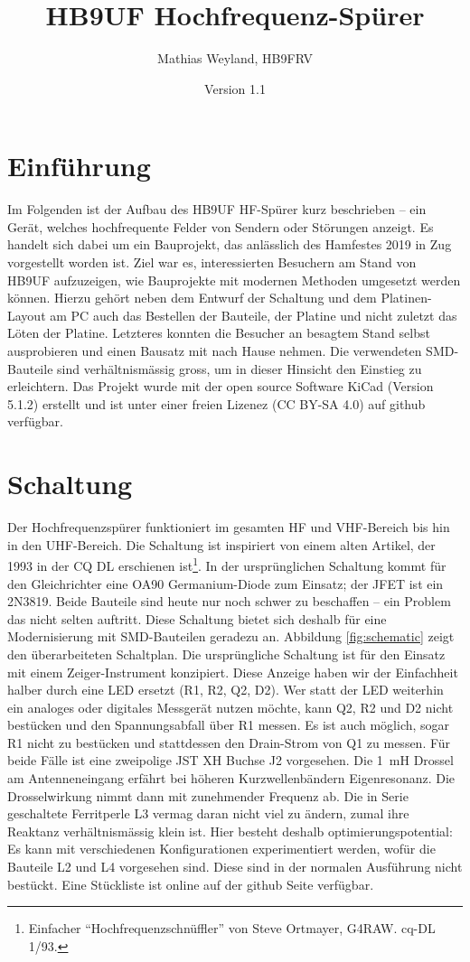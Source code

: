 \documentclass[a4paper,11pt,halfparskip,smallheadings,DIV=10]{scrartcl}
\title{HB9UF Hochfrequenz-Spürer}
\author{Mathias Weyland, HB9FRV}
\date{Version 1.1}
\begin{document}
\maketitle
\vspace{-1.5cm}

\section{Einführung}
Im Folgenden ist der Aufbau des HB9UF HF-Spürer kurz beschrieben -- ein
Gerät, welches hochfrequente Felder von Sendern oder Störungen anzeigt.
Es handelt sich dabei um ein Bauprojekt, das anlässlich des Hamfestes 2019 in
Zug vorgestellt worden ist. Ziel war es, interessierten Besuchern am Stand von
HB9UF aufzuzeigen, wie Bauprojekte mit modernen Methoden umgesetzt werden
können. Hierzu gehört neben dem Entwurf der Schaltung und dem Platinen-Layout
am PC auch das Bestellen der Bauteile, der Platine und nicht zuletzt das
Löten der Platine. Letzteres konnten die Besucher an besagtem Stand selbst
ausprobieren und einen Bausatz mit nach Hause nehmen. Die verwendeten
SMD-Bauteile sind verhältnismässig gross, um in dieser Hinsicht den
Einstieg zu erleichtern. Das Projekt wurde mit der open source Software
KiCad (Version 5.1.2) erstellt und ist unter einer freien Lizenez
(CC BY-SA 4.0) auf github verfügbar.

\section{Schaltung}
Der Hochfrequenzspürer funktioniert im gesamten HF und VHF-Bereich bis
hin in den UHF-Bereich. Die Schaltung ist inspiriert von einem alten
Artikel, der 1993 in der CQ DL erschienen ist\footnote{Einfacher
``Hochfrequenzschnüffler'' von Steve Ortmayer, G4RAW. cq-DL 1/93.}. In der
ursprünglichen Schaltung kommt für den Gleichrichter eine OA90 Germanium-Diode
zum Einsatz; der JFET ist ein 2N3819. Beide Bauteile sind heute nur noch schwer
zu beschaffen -- ein Problem das nicht selten auftritt. Diese Schaltung bietet
sich deshalb für eine Modernisierung mit SMD-Bauteilen geradezu an. Abbildung
\ref{fig:schematic} zeigt den überarbeiteten Schaltplan. Die ursprüngliche
Schaltung ist für den Einsatz mit einem Zeiger-Instrument konzipiert. Diese
Anzeige haben wir der Einfachheit halber durch eine LED ersetzt (R1, R2, Q2, D2).
Wer statt der LED weiterhin ein analoges oder digitales Messgerät nutzen
möchte, kann Q2, R2 und D2 nicht bestücken und den Spannungsabfall über
R1 messen. Es ist auch möglich, sogar R1 nicht zu bestücken und stattdessen
den Drain-Strom von Q1 zu messen. Für beide Fälle ist eine zweipolige JST XH
Buchse J2 vorgesehen. Die 1~mH Drossel am Antenneneingang erfährt bei höheren
Kurzwellenbändern Eigenresonanz. Die Drosselwirkung nimmt dann mit zunehmender
Frequenz ab. Die in Serie geschaltete Ferritperle L3 vermag daran nicht viel
zu ändern, zumal ihre Reaktanz verhältnismässig klein ist. Hier besteht deshalb
optimierungspotential: Es kann mit verschiedenen Konfigurationen experimentiert
werden, wofür die Bauteile L2 und L4 vorgesehen sind. Diese sind in der
normalen Ausführung nicht bestückt. Eine Stückliste ist online auf der github %
Seite verfügbar.
\end{document}
